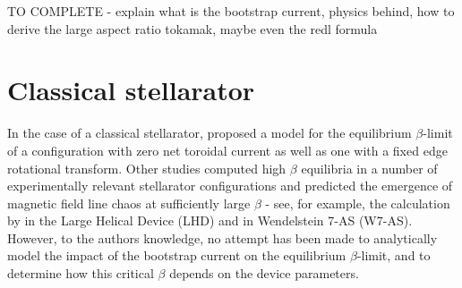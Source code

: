 \documentclass[my_thesis.tex]{subfiles}
\begin{document}
{\color{red} TO COMPLETE - explain what is the bootstrap current, physics behind, how to derive the large aspect ratio tokamak, maybe even the redl formula}

\section{Classical stellarator}


In the case of a classical stellarator, \citet{Loizu2017} proposed a model for the equilibrium $\beta$-limit of a configuration with zero net toroidal current as well as one with a fixed edge rotational transform. 
Other studies computed high $\beta$ equilibria in a number of experimentally relevant stellarator configurations and predicted the emergence of magnetic field line chaos at sufficiently large $\beta$ - see, for example, the calculation by \citet{suzukiTheoreticalStudiesEquilibrium2020} in the Large Helical Device (LHD) and \citet{Reiman2007} in Wendelstein 7-AS (W7-AS). However, to the authors knowledge, no attempt has been made to analytically model the impact of the bootstrap current on the equilibrium $\beta$-limit, and to determine how this critical $\beta$ depends on the device parameters.

\end{document}
